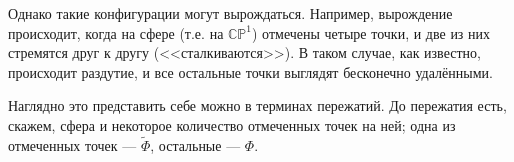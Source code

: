 \documentclass[11pt]{article}
\theoremstyle{remark}
\theoremstyle{definition}
\begin{document}
Однако такие конфигурации могут вырождаться. Например, вырождение происходит, когда на сфере (т.е. на $\mathbb{CP}^1$) отмечены четыре точки, и две из них стремятся друг к другу (<<сталкиваются>>). В таком случае, как известно, происходит раздутие, и все остальные точки выглядят бесконечно удалёнными.

Наглядно это представить себе можно в терминах пережатий. До пережатия есть, скажем, сфера и некоторое количество отмеченных точек на ней; одна из отмеченных точек --- $\tilde \Phi$, остальные --- $\Phi$.

\begin{center}
\end{center}
\end{document}
